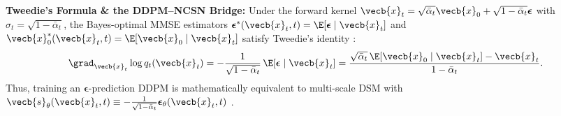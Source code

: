 \documentclass[../../../../master.tex]{subfiles}
\begin{document}
\begin{coremath}
\textbf{Tweedie's Formula \& the DDPM--NCSN Bridge:} Under the forward kernel $\vecb{x}_t = \sqrt{\bar{\alpha}_t}\vecb{x}_0 + \sqrt{1-\bar{\alpha}_t}\boldsymbol{\epsilon}$ with $\sigma_t = \sqrt{1-\bar{\alpha}_t}$, the Bayes-optimal MMSE estimators $\boldsymbol{\epsilon}^*(\vecb{x}_t, t) = \E[\boldsymbol{\epsilon} \mid \vecb{x}_t]$ and $\vecb{x}_0^*(\vecb{x}_t, t) = \E[\vecb{x}_0 \mid \vecb{x}_t]$ satisfy Tweedie's identity  :
\begin{equation}\label{eq:ddpm:tweedie}
  \grad_{\vecb{x}_t} \log q_t(\vecb{x}_t) = -\frac{1}{\sqrt{1 - \bar{\alpha}_t}}\,\E[\boldsymbol{\epsilon} \mid \vecb{x}_t] = \frac{\sqrt{\bar{\alpha}_t}\,\E[\vecb{x}_0 \mid \vecb{x}_t] - \vecb{x}_t}{1 - \bar{\alpha}_t}.
\end{equation}
Thus, training an $\boldsymbol{\epsilon}$-prediction DDPM is mathematically equivalent to multi-scale DSM with $\vecb{s}_\theta(\vecb{x}_t, t) \equiv -\frac{1}{\sqrt{1-\bar{\alpha}_t}}\boldsymbol{\epsilon}_\theta(\vecb{x}_t, t)$ .
\end{coremath}
\end{document}
